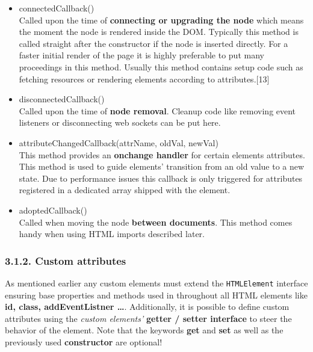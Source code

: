 \documentclass[]{article}
\providecommand{\tightlist}{%
  \setlength{\itemsep}{0pt}\setlength{\parskip}{0pt}}
\begin{document}
\begin{itemize}
\tightlist
\item
  connectedCallback()\\
  Called upon the time of \textbf{connecting or upgrading the node}
  which means the moment the node is rendered inside the DOM. Typically
  this method is called straight after the constructor if the node is
  inserted directly. For a faster initial render of the page it is
  highly preferable to put many proceedings in this method. Usually this
  method contains setup code such as fetching resources or rendering
  elements according to attributes.{[}13{]}
\item
  disconnectedCallback()\\
  Called upon the time of \textbf{node removal}. Cleanup code like
  removing event listeners or disconnecting web sockets can be put here.
\item
  attributeChangedCallback(attrName, oldVal, newVal)\\
  This method provides an \textbf{onchange handler} for certain elements
  attributes. This method is used to guide elements' transition from an
  old value to a new state. Due to performance issues this callback is
  only triggered for attributes registered in a dedicated array shipped
  with the element.
\item
  adoptedCallback()\\
  Called when moving the node \textbf{between documents}. This method
  comes handy when using HTML imports described later.
\end{itemize}

\subsubsection{3.1.2. Custom attributes}\label{custom-attributes}

As mentioned earlier any custom elements must extend the
\texttt{HTMLElement} interface ensuring base properties and methods used
in throughout all HTML elements like \textbf{id, class, addEventListner
\ldots{}}. Additionally, it is possible to define custom attributes
using the \emph{custom elements'} \textbf{getter / setter interface} to
steer the behavior of the element. Note that the keywords \textbf{get}
and \textbf{set} as well as the previously used \textbf{constructor} are
optional!
\end{document}
